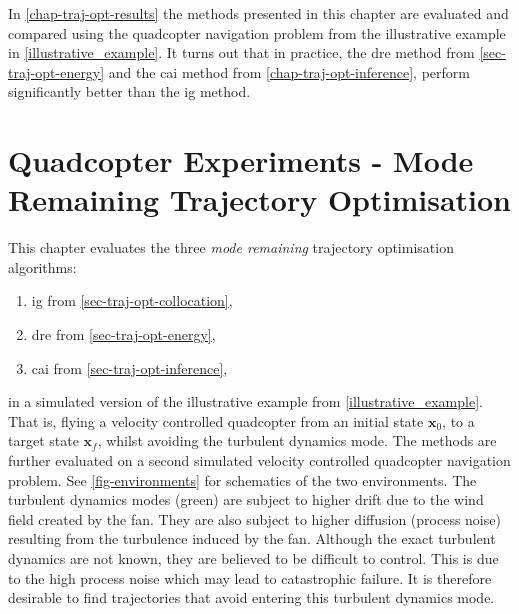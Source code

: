\documentclass{mimosis-class/mimosis}
\numberwithin{equation}{chapter}
\newcommand{\state}{\ensuremath{\mathbf{x}}}
\begin{document}
{In \cref{chap-traj-opt-results} the methods presented in this chapter are evaluated and compared using the
quadcopter navigation problem from the illustrative example in \cref{illustrative_example}.
It turns out that in practice, the \acrfull{dre} method from  \cref{sec-traj-opt-energy}
and the \acrfull{cai} method from \cref{chap-traj-opt-inference},
perform significantly better than the \acrfull{ig} method.

\chapter{Quadcopter Experiments - Mode Remaining Trajectory Optimisation \label{chap-traj-opt-results}}
\label{sec:org1a5e6d7}
\newcommand{\ig}{DELETEDELETE\xspace}
\newcommand{\dre}{DELETEDELETE\xspace}
\newcommand{\cai}{DELETEDELETE\xspace}
\newcommand{\deltaTime}{\ensuremath{\Delta \timeInd}}
\newcommand{\env}[1]{\ensuremath{\hat{#1}}}
\newcommand{\modeProbTraj}{\ensuremath{\Pr(\allModeVarK \mid \stateTraj)}}

\newcommand{\windDrift}[1]{\ensuremath{\bm\omega_{#1}}}
\newcommand{\windTurbulence}[1]{\ensuremath{\bm\epsilon_{#1}}}
\newcommand{\windTurbulenceNoise}[1]{\ensuremath{\bm\Sigma_{\windTurbulence{#1}}}}
This chapter evaluates the three \emph{mode remaining} trajectory optimisation algorithms:
\begin{enumerate}
\item \acrfull{ig} from \cref{sec-traj-opt-collocation},
\item \acrfull{dre} from \cref{sec-traj-opt-energy},
\item \acrfull{cai} from \cref{sec-traj-opt-inference},
\end{enumerate}
in a simulated version of the illustrative example from \cref{illustrative_example}.
That is, flying a velocity controlled quadcopter from an initial state \(\state_0\), to a target
state \(\state_{f}\), whilst avoiding the turbulent dynamics mode.
The methods are further evaluated on a second simulated velocity controlled quadcopter navigation problem.
See \cref{fig-environments} for schematics of the two environments.
The turbulent dynamics modes (green) are subject to higher drift due to the wind field created by the fan.
They are also subject to higher diffusion (process noise) resulting from the turbulence induced by the fan.
Although the exact turbulent dynamics are not known, they are believed to be difficult to control.
This is due to the high process noise which may lead to catastrophic failure.
It is therefore desirable to find trajectories that avoid entering this turbulent dynamics mode.

}
\end{document}
